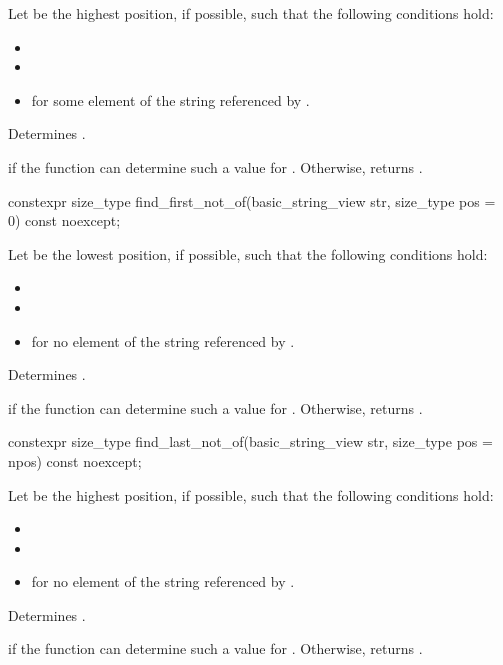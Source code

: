 \begin{itemdescr}
\pnum
Let  be the highest position, if possible, such that the following conditions hold:
\begin{itemize}
\item
{}
\item
{}
\item
{} for some element  of the string referenced by .
\end{itemize}

\pnum
\effects
Determines .

\pnum
\returns
{} if the function can determine such a value for .
Otherwise, returns .
\end{itemdescr}

%
\begin{itemdecl}
constexpr size_type find_first_not_of(basic_string_view str, size_type pos = 0) const noexcept;
\end{itemdecl}

\begin{itemdescr}
\pnum
Let  be the lowest position, if possible, such that the following conditions hold:
\begin{itemize}
\item
{}
\item
{}
\item
{} for no element  of the string referenced by .
\end{itemize}

\pnum
\effects
Determines .

\pnum
\returns
{} if the function can determine such a value for . Otherwise, returns .
\end{itemdescr}

%
\begin{itemdecl}
constexpr size_type find_last_not_of(basic_string_view str, size_type pos = npos) const noexcept;
\end{itemdecl}

\begin{itemdescr}
\pnum
Let  be the highest position, if possible, such that the following conditions hold:
\begin{itemize}
\item
{}
\item
{}
\item
{} for no element  of the string referenced by .
\end{itemize}

\pnum
\effects
Determines .

\pnum
\returns
{} if the function can determine such a value for .
Otherwise, returns .
\end{itemdescr}

